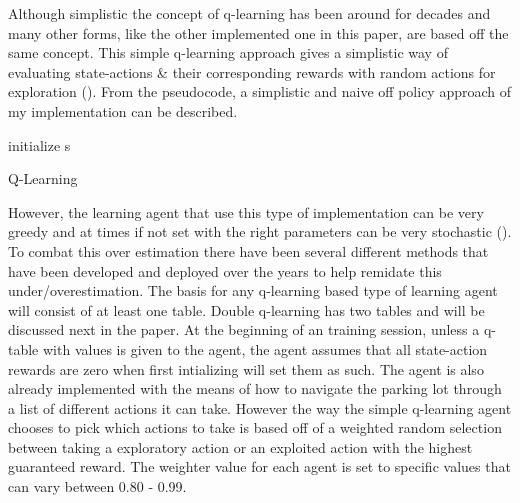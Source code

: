 \documentclass[letterpaper]{article}
\begin{document}
Although simplistic the concept of q-learning has been around for decades and many other forms, like the other implemented one in this paper, are based off the same concept.  This simple q-learning approach gives a simplistic way of evaluating state-actions \& their corresponding rewards with random actions for exploration (\cite{watkins1992q}).  From the pseudocode, a simplistic and naive off policy approach of my implementation can be described.

\begin{algorithm}[h]
  initialize s\;
 \caption{Q-Learning}
\end{algorithm}
However, the learning agent that use this type of implementation can be very greedy and at times if not set with the right parameters can be very stochastic (\cite{sutton2018reinforcement}).  To combat this over estimation there have been several different methods that have been developed and deployed over the years to help remidate this under/overestimation. The basis for any q-learning based type of learning agent will consist of at least one table.  Double q-learning has two tables and will be discussed next in the paper.  At the beginning of an training session, unless a q-table with values is given to the agent, the agent assumes that all state-action rewards are zero when first intializing will set them as such.  The agent is also already implemented with the means of how to navigate the parking lot through a list of different actions it can take.  However the way the simple q-learning agent chooses to pick which actions to take is based off of a weighted random selection between taking a exploratory action or an exploited action with the highest guaranteed reward. The weighter value for each agent is set to specific values that can vary between 0.80 - 0.99. 
\end{document}
